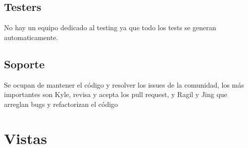 \documentclass{article}
\begin{document}
  \subsection*{Testers}
  No hay un equipo dedicado al testing ya que todo los tests se generan automaticamente.
  \subsection*{Soporte}
  Se ocupan de mantener el código y resolver los issues de la comunidad, los más importantes son Kyle, revisa y acepta los pull request, y Ragil y Jing que  arreglan bugs y refactorizan el código
\section{Vistas}
\end{document}
